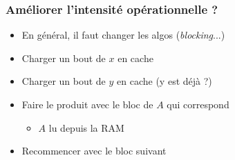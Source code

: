 \documentclass[xcolor={x11names,svgnames}]{beamer}
\begin{document}

\begin{frame}[fragile, label=blocking]
  \frametitle{Améliorer l'intensité opérationnelle ?}

  \begin{itemize}
  \item En général, il faut changer les algos (\alert{\emph{blocking}}...)
  \end{itemize}

  \begin{center}
\end{center}

\begin{itemize}
\item Charger un bout de $x$ en cache
\item Charger un bout de $y$ en cache (y est déjà ?)
\item Faire le produit avec le bloc de $A$ qui correspond
  \begin{itemize}
  \item $A$ lu depuis la RAM
  \end{itemize}
\item Recommencer avec le bloc suivant
\end{itemize}
\end{frame}

              
\end{document}
